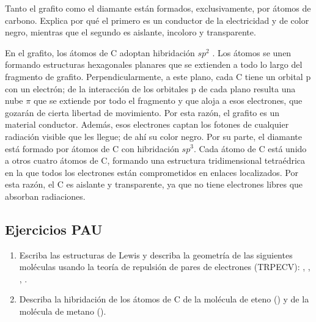 \begin{question}
    Tanto el grafito como el diamante están formados, exclusivamente,
    por átomos de carbono.
    Explica por qué el primero es un conductor de la electricidad y de color
    negro, mientras que el segundo es aislante, incoloro y transparente.
    \begin{solu}
        En el grafito, los átomos de C adoptan hibridación \(sp^2\) .
        Los
        átomos se unen formando estructuras hexagonales planares
        que se extienden a todo lo largo del fragmento de grafito.
        Perpendicularmente, a este plano, cada C tiene un orbital p
        con un electrón; de la interacción de los orbitales p de cada
        plano resulta una nube \(\pi\) que se extiende por todo el fragmento
        y que aloja a esos electrones, que gozarán de cierta
        libertad de movimiento.
        Por esta razón, el grafito es un material
        conductor.
        Además, esos electrones captan los fotones
        de cualquier radiación visible que les llegue; de ahí su color
        negro.
        Por su parte, el diamante está formado por átomos de C
        con hibridación \(sp^3\).
        Cada átomo de C está unido a otros
        cuatro átomos de C, formando una estructura tridimensional
        tetraédrica en la que todos los electrones están comprometidos
        en enlaces localizados.
        Por esta razón, el C es aislante y
        transparente, ya que no tiene electrones libres que absorban
        radiaciones.
    \end{solu}
\end{question}

\subsection{Ejercicios PAU}
\begin{exerciseEVAU}
\begin{enumerate}[label=\letraminuscula]
    \item Escriba las estructuras de Lewis y describa la geometría de las siguientes moléculas usando
la teoría de repulsión de pares de electrones (TRPECV): , , , .
    \item Describa la hibridación de los átomos de C de la molécula de eteno () y de la molécula
de metano ().
\end{enumerate}
\begin{solu}

\end{solu}
\end{exerciseEVAU}


